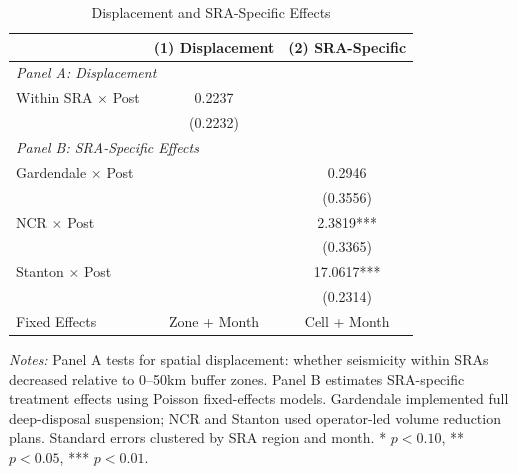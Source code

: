 \begin{table}[htbp]
\centering
\caption{Displacement and SRA-Specific Effects}
\label{tab:displacement}
\begin{threeparttable}
\begin{tabular}{lcc}
\toprule
 & (1) Displacement & (2) SRA-Specific \\
\midrule
\multicolumn{3}{l}{\textit{Panel A: Displacement}} \\
Within SRA $\times$ Post & 0.2237 & \\
 & (0.2232) & \\
[0.5em]
\multicolumn{3}{l}{\textit{Panel B: SRA-Specific Effects}} \\
Gardendale $\times$ Post & & 0.2946 \\
 & & (0.3556) \\
NCR $\times$ Post & & 2.3819*** \\
 & & (0.3365) \\
Stanton $\times$ Post & & 17.0617*** \\
 & & (0.2314) \\
\midrule
Fixed Effects & Zone + Month & Cell + Month \\
\bottomrule
\end{tabular}
\begin{tablenotes}[flushleft]\small
\item \textit{Notes:} Panel A tests for spatial displacement: whether seismicity within SRAs decreased relative to 0--50km buffer zones. Panel B estimates SRA-specific treatment effects using Poisson fixed-effects models. Gardendale implemented full deep-disposal suspension; NCR and Stanton used operator-led volume reduction plans. Standard errors clustered by SRA region and month. * $p<0.10$, ** $p<0.05$, *** $p<0.01$.
\end{tablenotes}
\end{threeparttable}
\end{table}
